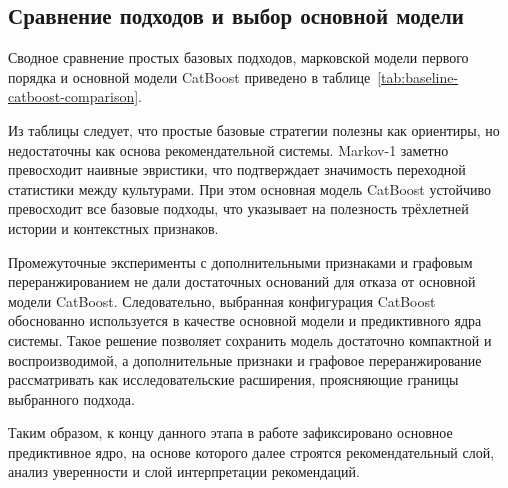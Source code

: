 

\subsection{Сравнение подходов и выбор основной модели}

Сводное сравнение простых базовых подходов, марковской модели первого порядка и основной модели CatBoost приведено в
таблице~\ref{tab:baseline-catboost-comparison}.



Из таблицы следует, что простые базовые стратегии полезны как ориентиры, но недостаточны как основа рекомендательной
системы. Markov-1 заметно превосходит наивные эвристики, что подтверждает значимость переходной статистики между
культурами. При этом основная модель CatBoost устойчиво превосходит все базовые подходы, что указывает на полезность
трёхлетней истории и контекстных признаков.

Промежуточные эксперименты с дополнительными признаками и графовым переранжированием не дали достаточных оснований для
отказа от основной модели CatBoost. Следовательно, выбранная конфигурация CatBoost обоснованно используется в качестве
основной модели и предиктивного ядра системы. Такое решение позволяет сохранить модель достаточно компактной и
воспроизводимой, а дополнительные признаки и графовое переранжирование рассматривать как исследовательские расширения,
проясняющие границы выбранного подхода.

Таким образом, к концу данного этапа в работе зафиксировано основное предиктивное ядро, на основе которого далее
строятся рекомендательный слой, анализ уверенности и слой интерпретации рекомендаций.
